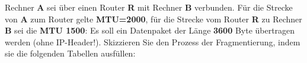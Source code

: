 
Rechner \textbf{A} sei über einen Router \textbf{R} mit Rechner \textbf{B} verbunden.
Für die Strecke von \textbf{A} zum Router gelte \textbf{MTU=2000}, für die Strecke vom Router \textbf{R} zu Rechner \textbf{B} sei die \textbf{MTU 1500}:
Es soll ein Datenpaket der Länge \textbf{3600} Byte übertragen werden (ohne IP-Header!).
Skizzieren Sie den Prozess der Fragmentierung, indem sie die folgenden Tabellen ausfüllen:

\begin{flushleft}
\end{flushleft}
